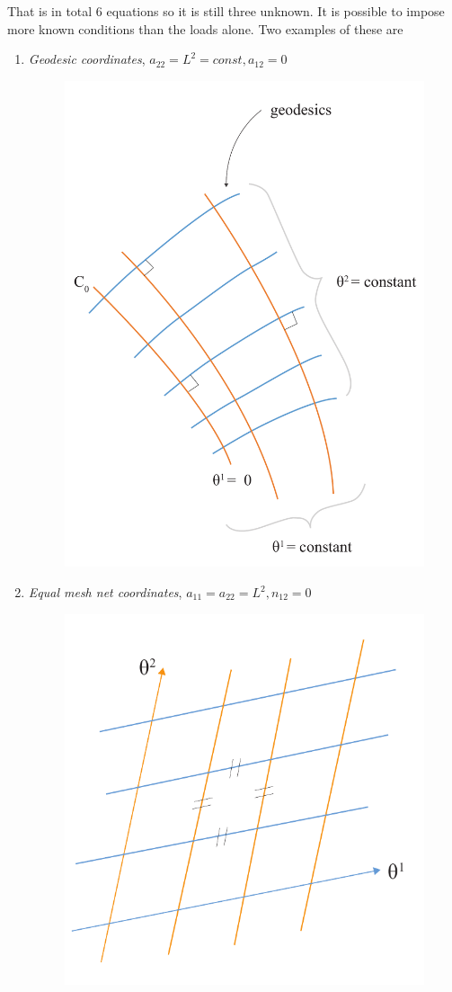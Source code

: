 That is in total 6 equations so it is still three unknown. It is possible to impose more known conditions than the loads alone. Two examples of these are
\vspace{5mm}
\begin{enumerate}
\item \textit{Geodesic coordinates}, $a_{22} = L^2 = const, a_{12}=0$
\begin{figure}[H]
\centering
\includegraphics[height=0.7\linewidth ]{figure/Theory/geodesicCoordRe.pdf}
\end{figure}
\item \textit{Equal mesh net coordinates}, $a_{11}= a_{22} = L^2, n_{12}=0$ 
\begin{figure}[H]
\centering
\includegraphics[height=0.4\linewidth ]{figure/Theory/equalMeshFrei.pdf}
\end{figure}
\end{enumerate}


